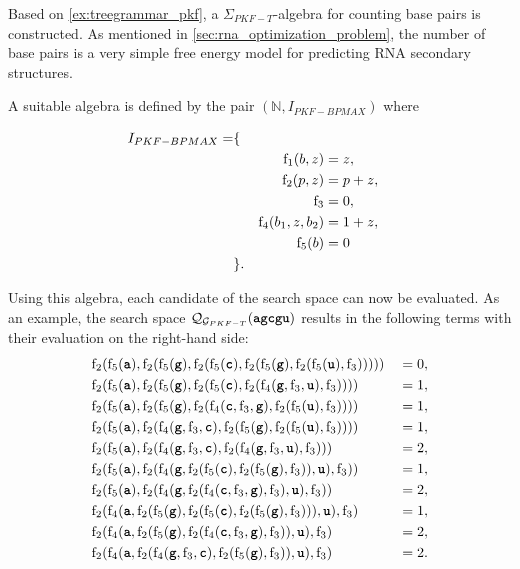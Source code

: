 \documentclass[
    a4paper,
    12pt,
    twoside,
    BCOR=12mm,
    parskip=half,
    chapterprefix,
    numbers=noenddot,
    bibliography=totoc
]{scrbook}
\begin{document}
\begin{example}
\label{ex:ev_algebra_pkf}
	Based on \cref{ex:treegrammar_pkf}, a $\Sigma_{PKF-T}$-algebra for counting base pairs is constructed. As mentioned in \cref{sec:rna_optimization_problem}, the number of base pairs is a very simple free energy model for predicting \gls{RNA} secondary structures.
	 
	A suitable algebra is defined by the pair $(\mathbb{N}, I_{PKF-BPMAX})$ where
  
  \pagebreak
  
	\begin{align*}
		I_{PKF-BPMAX} = &\{&\\
    &&\mathrm{f}_1 (b,z) &= z,\\
		&&\mathrm{f}_2 (p,z) &= p + z,\\
		&&\mathrm{f}_3  &= 0,\\
		&&\mathrm{f}_4 (b_1,z,b_2) &= 1 + z,\\
		&&\mathrm{f}_5 (b) &= 0\\
		&\}.&&
	\end{align*}
	
	Using this algebra, each candidate of the search space can now be evaluated. As an example, the search space $\mathcal{Q}_{\mathcal{G}_{PKF-T}}(\ts{agcgu})$ results in the following terms with their evaluation on the right-hand side:
	\begin{align*}
		&\op{f}_2(\op{f}_5(\ts{a}),\op{f}_2(\op{f}_5(\ts{g}),\op{f}_2(\op{f}_5(\ts{c}),\op{f}_2(\op{f}_5(\ts{g}),\op{f}_2(\op{f}_5(\ts{u}),\op{f}_3))))) &&= 0, \\
		&\op{f}_2(\op{f}_5(\ts{a}),\op{f}_2(\op{f}_5(\ts{g}),\op{f}_2(\op{f}_5(\ts{c}),\op{f}_2(\op{f}_4(\ts{g},\op{f}_3,\ts{u}),\op{f}_3)))) &&= 1,\\
		&\op{f}_2(\op{f}_5(\ts{a}),\op{f}_2(\op{f}_5(\ts{g}),\op{f}_2(\op{f}_4(\ts{c},\op{f}_3,\ts{g}),\op{f}_2(\op{f}_5(\ts{u}),\op{f}_3)))) &&= 1,\\
		&\op{f}_2(\op{f}_5(\ts{a}),\op{f}_2(\op{f}_4(\ts{g},\op{f}_3,\ts{c}),\op{f}_2(\op{f}_5(\ts{g}),\op{f}_2(\op{f}_5(\ts{u}),\op{f}_3)))) &&= 1,\\
		&\op{f}_2(\op{f}_5(\ts{a}),\op{f}_2(\op{f}_4(\ts{g},\op{f}_3,\ts{c}),\op{f}_2(\op{f}_4(\ts{g},\op{f}_3,\ts{u}),\op{f}_3))) &&= 2,\\
		&\op{f}_2(\op{f}_5(\ts{a}),\op{f}_2(\op{f}_4(\ts{g},\op{f}_2(\op{f}_5(\ts{c}),\op{f}_2(\op{f}_5(\ts{g}),\op{f}_3)),\ts{u}),\op{f}_3)) &&= 1,\\
		&\op{f}_2(\op{f}_5(\ts{a}),\op{f}_2(\op{f}_4(\ts{g},\op{f}_2(\op{f}_4(\ts{c},\op{f}_3,\ts{g}),\op{f}_3),\ts{u}),\op{f}_3)) &&= 2,\\
		&\op{f}_2(\op{f}_4(\ts{a},\op{f}_2(\op{f}_5(\ts{g}),\op{f}_2(\op{f}_5(\ts{c}),\op{f}_2(\op{f}_5(\ts{g}),\op{f}_3))),\ts{u}),\op{f}_3) &&= 1,\\
		&\op{f}_2(\op{f}_4(\ts{a},\op{f}_2(\op{f}_5(\ts{g}),\op{f}_2(\op{f}_4(\ts{c},\op{f}_3,\ts{g}),\op{f}_3)),\ts{u}),\op{f}_3) &&= 2,\\
		&\op{f}_2(\op{f}_4(\ts{a},\op{f}_2(\op{f}_4(\ts{g},\op{f}_3,\ts{c}),\op{f}_2(\op{f}_5(\ts{g}),\op{f}_3)),\ts{u}),\op{f}_3) &&= 2.
	\end{align*}
	

\end{example}
\end{document}
